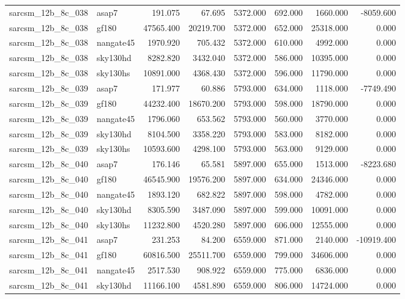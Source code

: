 \begin{tabular}{llrrrrrr}
sarcsm\_12b\_8c\_038 & asap7 & 191.075 & 67.695 & 5372.000 & 692.000 & 1660.000 & -8059.600 \\
sarcsm\_12b\_8c\_038 & gf180 & 47565.400 & 20219.700 & 5372.000 & 652.000 & 25318.000 & 0.000 \\
sarcsm\_12b\_8c\_038 & nangate45 & 1970.920 & 705.432 & 5372.000 & 610.000 & 4992.000 & 0.000 \\
sarcsm\_12b\_8c\_038 & sky130hd & 8282.820 & 3432.040 & 5372.000 & 586.000 & 10395.000 & 0.000 \\
sarcsm\_12b\_8c\_038 & sky130hs & 10891.000 & 4368.430 & 5372.000 & 596.000 & 11790.000 & 0.000 \\
sarcsm\_12b\_8c\_039 & asap7 & 171.977 & 60.886 & 5793.000 & 634.000 & 1118.000 & -7749.490 \\
sarcsm\_12b\_8c\_039 & gf180 & 44232.400 & 18670.200 & 5793.000 & 598.000 & 18790.000 & 0.000 \\
sarcsm\_12b\_8c\_039 & nangate45 & 1796.060 & 653.562 & 5793.000 & 560.000 & 3770.000 & 0.000 \\
sarcsm\_12b\_8c\_039 & sky130hd & 8104.500 & 3358.220 & 5793.000 & 583.000 & 8182.000 & 0.000 \\
sarcsm\_12b\_8c\_039 & sky130hs & 10593.600 & 4298.100 & 5793.000 & 563.000 & 9129.000 & 0.000 \\
sarcsm\_12b\_8c\_040 & asap7 & 176.146 & 65.581 & 5897.000 & 655.000 & 1513.000 & -8223.680 \\
sarcsm\_12b\_8c\_040 & gf180 & 46545.900 & 19576.200 & 5897.000 & 634.000 & 24346.000 & 0.000 \\
sarcsm\_12b\_8c\_040 & nangate45 & 1893.120 & 682.822 & 5897.000 & 598.000 & 4782.000 & 0.000 \\
sarcsm\_12b\_8c\_040 & sky130hd & 8305.590 & 3487.090 & 5897.000 & 599.000 & 10091.000 & 0.000 \\
sarcsm\_12b\_8c\_040 & sky130hs & 11232.800 & 4520.280 & 5897.000 & 606.000 & 12555.000 & 0.000 \\
sarcsm\_12b\_8c\_041 & asap7 & 231.253 & 84.200 & 6559.000 & 871.000 & 2140.000 & -10919.400 \\
sarcsm\_12b\_8c\_041 & gf180 & 60816.500 & 25511.700 & 6559.000 & 799.000 & 34606.000 & 0.000 \\
sarcsm\_12b\_8c\_041 & nangate45 & 2517.530 & 908.922 & 6559.000 & 775.000 & 6836.000 & 0.000 \\
sarcsm\_12b\_8c\_041 & sky130hd & 11166.100 & 4581.890 & 6559.000 & 806.000 & 14724.000 & 0.000 \\

\end{tabular}
